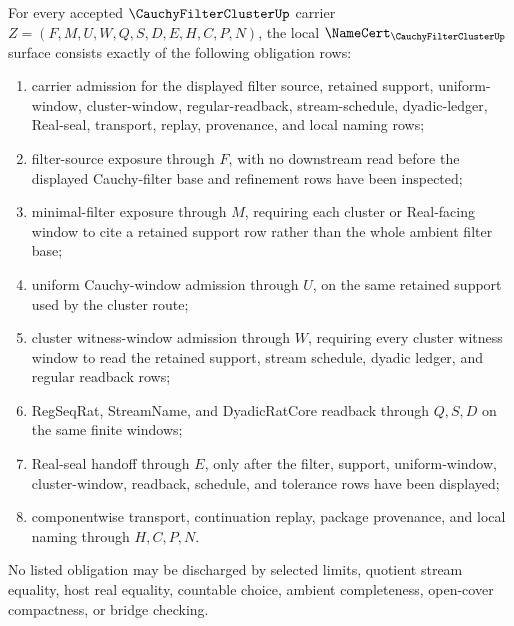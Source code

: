 \begin{theorem}\label{thm:cauchy-filter-cluster-namecert-obligations}
For every accepted $\CauchyFilterClusterUp$ carrier $Z=(F,M,U,W,Q,S,D,E,H,C,P,N)$, the local $\NameCert_{\CauchyFilterClusterUp}$ surface consists exactly of the following obligation rows:
\begin{enumerate}
\item carrier admission for the displayed filter source, retained support, uniform-window, cluster-window, regular-readback, stream-schedule, dyadic-ledger, Real-seal, transport, replay, provenance, and local naming rows;
\item filter-source exposure through $F$, with no downstream read before the displayed Cauchy-filter base and refinement rows have been inspected;
\item minimal-filter exposure through $M$, requiring each cluster or Real-facing window to cite a retained support row rather than the whole ambient filter base;
\item uniform Cauchy-window admission through $U$, on the same retained support used by the cluster route;
\item cluster witness-window admission through $W$, requiring every cluster witness window to read the retained support, stream schedule, dyadic ledger, and regular readback rows;
\item RegSeqRat, StreamName, and DyadicRatCore readback through $Q,S,D$ on the same finite windows;
\item Real-seal handoff through $E$, only after the filter, support, uniform-window, cluster-window, readback, schedule, and tolerance rows have been displayed;
\item componentwise transport, continuation replay, package provenance, and local naming through $H,C,P,N$.
\end{enumerate}
No listed obligation may be discharged by selected limits, quotient stream equality, host real equality, countable choice, ambient completeness, open-cover compactness, or bridge checking.
\end{theorem}
